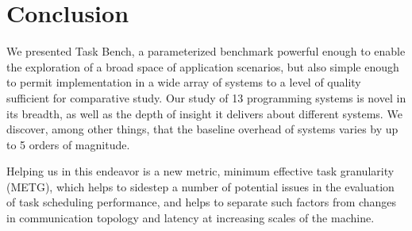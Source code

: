 \section{Conclusion}
\label{sec:conclusion}

We presented Task Bench, a parameterized benchmark powerful enough to
enable the exploration of a broad space of application scenarios, but
also simple enough to permit implementation in a wide array of systems
to a level of quality sufficient for comparative study. Our study of
13 programming systems is novel in its breadth, as well as the depth
of insight it delivers about different systems. We discover, among
other things, that the baseline overhead of systems varies by up to 5
orders of magnitude.

Helping us in this endeavor is a new metric, minimum effective task
granularity (METG), which helps to sidestep a number of potential
issues in the evaluation of task scheduling performance, and helps to
separate such factors from changes in communication topology and
latency at increasing scales of the machine.
